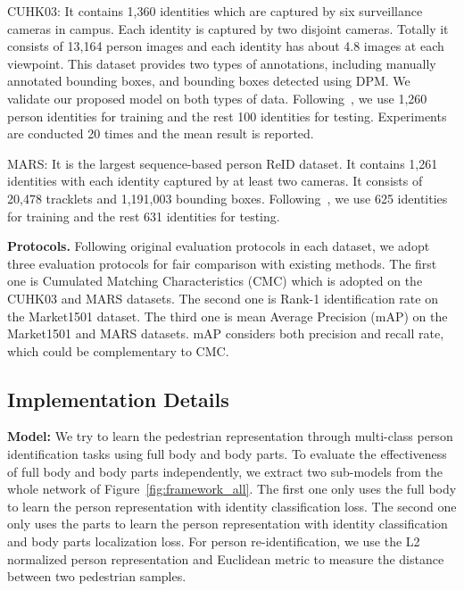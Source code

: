 \documentclass[10pt,twocolumn,letterpaper]{article}
\begin{document}
CUHK03: It contains 1,360 identities which are captured by six surveillance cameras in campus.
Each identity is captured by two disjoint cameras.
Totally it consists of 13,164 person images and each identity has about 4.8 images at each viewpoint.
This dataset provides two types of annotations, including manually annotated bounding boxes, and bounding boxes detected using DPM.
We validate our proposed model on both types of data.
Following~\cite{LiWeiCVPR14}, we use 1,260 person identities for training and the rest 100 identities for testing.
Experiments are conducted 20 times and the mean result is reported.

MARS: It is the largest sequence-based person ReID dataset.
It contains 1,261 identities with each identity captured by at least two cameras.
It consists of 20,478 tracklets and 1,191,003 bounding boxes.
Following~\cite{ZhengliangECCV16}, we use 625 identities for training and the rest 631 identities for testing.

\textbf{Protocols.}
Following original evaluation protocols in each dataset, we adopt three evaluation protocols for fair comparison with existing methods.
The first one is Cumulated Matching Characteristics (CMC) which is adopted on the CUHK03 and MARS datasets.
The second one is Rank-1 identification rate on the Market1501 dataset.
The third one is mean Average Precision (mAP) on the Market1501 and MARS datasets.
mAP considers both precision and recall rate, which could be complementary to CMC.


\subsection{Implementation Details}
\label{exp:detail}
\textbf{Model:} We try to learn the pedestrian representation through multi-class person identification tasks using full body and body parts.
To evaluate the effectiveness of full body and body parts independently, we extract two sub-models from the whole network of Figure~\ref{fig:framework_all}.
The first one only uses the full body to learn the person representation with identity classification loss.
The second one only uses the parts to learn the person representation with identity classification and body parts localization loss.
For person re-identification, we use the L2 normalized person representation and Euclidean metric to measure the distance between two pedestrian samples.
\end{document}
